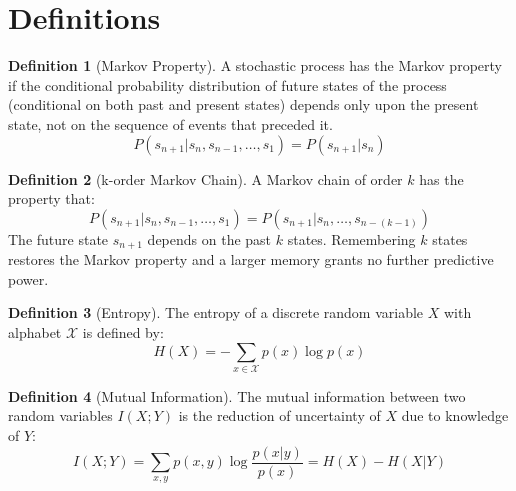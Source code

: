 \documentclass{article} %
\title{}
\author{}
\theoremstyle{definition}
\newtheorem{definition}{Definition}[section]
\begin{document}
\maketitle

\begin{abstract}
We seek to contribute:\\
1) A clear understanding of Partial Observability as it relates to
state, agent, and task.\\
2) A measure of the degree to which a domain is partially observable.\\
3) A way to quantify the deficiency of a given state representation.\\
\end{abstract}

\section{Definitions}

\begin{definition}[Markov Property]
A stochastic process has the Markov property if the conditional
probability distribution of future states of the process (conditional
on both past and present states) depends only upon the present state,
not on the sequence of events that preceded it.
\[
P(s_{n+1} | s_{n}, s_{n-1}, \dots, s_{1}) = P(s_{n+1} | s_{n})
\]
\end{definition}

\begin{definition}[k-order Markov Chain]
A Markov chain of order $k$ has the property that:
\[
P(s_{n+1} | s_{n}, s_{n-1}, \dots, s_{1}) = P(s_{n+1} | s_{n}, \dots, s_{n-(k-1)})
\]
The future state $s_{n+1}$ depends on the past $k$ states. Remembering
$k$ states restores the Markov property and a larger memory grants no
further predictive power.
\end{definition}

\begin{definition}[Entropy]
\label{def:entropy}
The entropy of a discrete random variable $X$ with alphabet $\mathcal{X}$ is
defined by:
\[
H(X) = -\sum_{x\in \mathcal{X}} p(x) \log p(x)
\]
\end{definition}

\begin{definition}[Mutual Information]
The mutual information between two random variables $I(X;Y)$ is the
reduction of uncertainty of $X$ due to knowledge of $Y$:
\[
I(X;Y) = \sum_{x,y} p(x,y) \log \frac{p(x|y)}{p(x)} = H(X) - H(X|Y)
\]
\end{definition}
\end{document}

